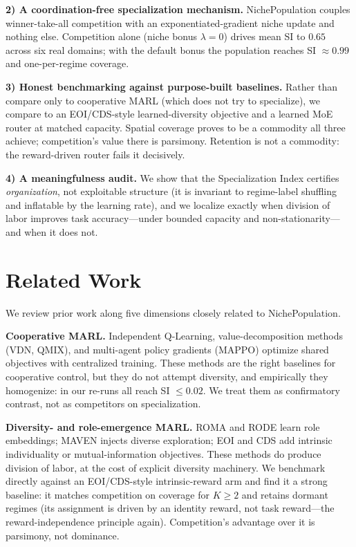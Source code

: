 \documentclass[11pt]{article}
\begin{document}
\textbf{2) A coordination-free specialization mechanism.} NichePopulation couples
winner-take-all competition with an exponentiated-gradient niche update and
nothing else. Competition alone (niche bonus $\lambda=0$) drives mean SI to
$0.65$ across six real domains; with the default bonus the population reaches
SI $\approx 0.99$ and one-per-regime coverage.

\textbf{3) Honest benchmarking against purpose-built baselines.} Rather than
compare only to cooperative MARL (which does not try to specialize), we compare
to an EOI/CDS-style learned-diversity objective and a learned MoE router at
matched capacity. Spatial coverage proves to be a commodity all three achieve;
competition's value there is parsimony. Retention is not a commodity: the
reward-driven router fails it decisively.

\textbf{4) A meaningfulness audit.} We show that the Specialization Index
certifies \emph{organization}, not exploitable structure (it is invariant to
regime-label shuffling and inflatable by the learning rate), and we localize
exactly when division of labor improves task accuracy---under bounded capacity
and non-stationarity---and when it does not.

\section{Related Work}

We review prior work along five dimensions closely related to NichePopulation.

\textbf{Cooperative MARL.} Independent Q-Learning, value-decomposition methods
(VDN, QMIX), and multi-agent policy gradients (MAPPO) optimize shared objectives
with centralized training. These methods are the right baselines for cooperative
control, but they do not attempt diversity, and empirically they homogenize: in
our re-runs all reach SI $\le 0.02$. We treat them as confirmatory contrast, not
as competitors on specialization.

\textbf{Diversity- and role-emergence MARL.} ROMA \cite{wang2020roma} and RODE
\cite{wang2021rode} learn role embeddings; MAVEN \cite{mahajan2019maven}
injects diverse exploration; EOI \cite{jiang2021eoi} and CDS \cite{li2021cds}
add intrinsic individuality or mutual-information objectives. These methods do produce
division of labor, at the cost of explicit diversity machinery. We benchmark
directly against an EOI/CDS-style intrinsic-reward arm and find it a strong
baseline: it matches competition on coverage for $K\ge2$ and retains dormant
regimes (its assignment is driven by an identity reward, not task reward---the
reward-independence principle again). Competition's advantage over it is
parsimony, not dominance.
\end{document}
